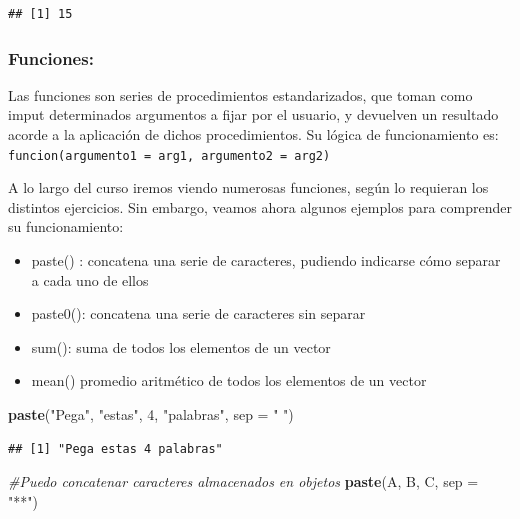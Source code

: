\documentclass[]{book}
\newenvironment{Shaded}{\begin{snugshade}}{\end{snugshade}}
\newcommand{\CommentTok}[1]{\textcolor[rgb]{0.56,0.35,0.01}{\textit{#1}}}
\newcommand{\DataTypeTok}[1]{\textcolor[rgb]{0.13,0.29,0.53}{#1}}
\newcommand{\DecValTok}[1]{\textcolor[rgb]{0.00,0.00,0.81}{#1}}
\newcommand{\KeywordTok}[1]{\textcolor[rgb]{0.13,0.29,0.53}{\textbf{#1}}}
\newcommand{\NormalTok}[1]{#1}
\newcommand{\StringTok}[1]{\textcolor[rgb]{0.31,0.60,0.02}{#1}}
\providecommand{\tightlist}{%
  \setlength{\itemsep}{0pt}\setlength{\parskip}{0pt}}
\begin{document}
\begin{verbatim}
## [1] 15
\end{verbatim}

\hypertarget{funciones}{%
\subsubsection{Funciones:}\label{funciones}}

Las funciones son series de procedimientos estandarizados, que toman como imput determinados argumentos a fijar por el usuario, y devuelven un resultado acorde a la aplicación de dichos procedimientos. Su lógica de funcionamiento es:\\
\texttt{funcion(argumento1\ =\ arg1,\ argumento2\ =\ arg2)}

A lo largo del curso iremos viendo numerosas funciones, según lo requieran los distintos ejercicios. Sin embargo, veamos ahora algunos ejemplos para comprender su funcionamiento:

\begin{itemize}
\tightlist
\item
  paste() : concatena una serie de caracteres, pudiendo indicarse cómo separar a cada uno de ellos\\
\item
  paste0(): concatena una serie de caracteres sin separar
\item
  sum(): suma de todos los elementos de un vector\\
\item
  mean() promedio aritmético de todos los elementos de un vector
\end{itemize}

\begin{Shaded}
\begin{Highlighting}[]
\KeywordTok{paste}\NormalTok{(}\StringTok{"Pega"}\NormalTok{, }\StringTok{"estas"}\NormalTok{, }\DecValTok{4}\NormalTok{, }\StringTok{"palabras"}\NormalTok{, }\DataTypeTok{sep =} \StringTok{" "}\NormalTok{)}
\end{Highlighting}
\end{Shaded}

\begin{verbatim}
## [1] "Pega estas 4 palabras"
\end{verbatim}

\begin{Shaded}
\begin{Highlighting}[]
\CommentTok{#Puedo concatenar caracteres almacenados en objetos}
\KeywordTok{paste}\NormalTok{(A, B, C, }\DataTypeTok{sep =} \StringTok{"**"}\NormalTok{)}
\end{Highlighting}
\end{Shaded}
\end{document}
